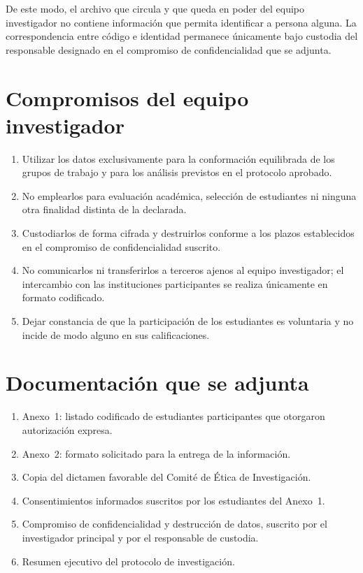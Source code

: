 \documentclass[11pt,a4paper]{article}
\begin{document}
De este modo, el archivo que circula y que queda en poder del equipo investigador no contiene informaci\'on que permita identificar a persona alguna. La correspondencia entre c\'odigo e identidad permanece \'unicamente bajo custodia del responsable designado en el compromiso de confidencialidad que se adjunta.

\section{Compromisos del equipo investigador}

\begin{enumerate}[label=\textbf{\alph*)},leftmargin=1.0cm]
	\item Utilizar los datos exclusivamente para la conformaci\'on equilibrada de los grupos de trabajo y para los an\'alisis previstos en el protocolo aprobado.
	\item No emplearlos para evaluaci\'on acad\'emica, selecci\'on de estudiantes ni ninguna otra finalidad distinta de la declarada.
	\item Custodiarlos de forma cifrada y destruirlos conforme a los plazos establecidos en el compromiso de confidencialidad suscrito.
	\item No comunicarlos ni transferirlos a terceros ajenos al equipo investigador; el intercambio con las instituciones participantes se realiza \'unicamente en formato codificado.
	\item Dejar constancia de que la participaci\'on de los estudiantes es voluntaria y no incide de modo alguno en sus calificaciones.
\end{enumerate}

\section{Documentaci\'on que se adjunta}

\begin{enumerate}[label=\textbf{\arabic*.},leftmargin=1.0cm]
	\item Anexo~1: listado codificado de estudiantes participantes que otorgaron autorizaci\'on expresa.
	\item Anexo~2: formato solicitado para la entrega de la informaci\'on.
	\item Copia del dictamen favorable del Comit\'e de \'Etica de Investigaci\'on.
	\item Consentimientos informados suscritos por los estudiantes del Anexo~1.
	\item Compromiso de confidencialidad y destrucci\'on de datos, suscrito por el investigador principal y por el responsable de custodia.
	\item Resumen ejecutivo del protocolo de investigaci\'on.
\end{enumerate}
\end{document}
